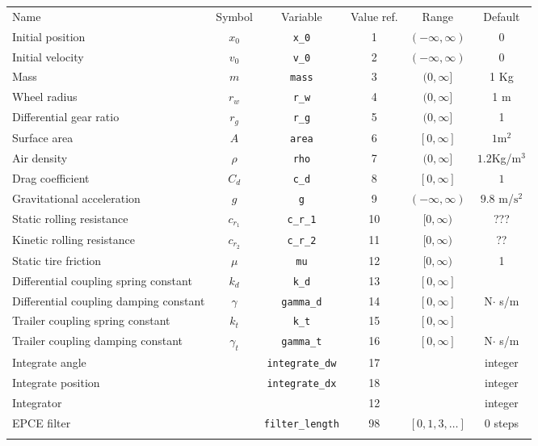 \documentclass[10pt,notitlepage,abstracton]{scrartcl}
\theoremstyle{plain}
\theoremstyle{plain}
\theoremstyle{plain}
\begin{document}
\begin{tabularx}{1.0\linewidth}[H]{ ||X|c|c|c|c|c|| }
  \hhline{|======|}
  Name & Symbol & Variable & Value ref. & Range & Default \\
  \hhline{|======|}
  Initial position & $x_{0}$ & \texttt{x\_0} & 1  & $(-\infty,\infty)$ & 0 \\ \hline
  Initial velocity & $v_{0}$ & \texttt{v\_0} & 2  & $(-\infty,\infty)$ & 0 \\ \hline
  Mass  & $m$ & \texttt{mass}& 3 & $(0,\infty]$ & 1 Kg \\ \hline
  Wheel radius &$r_{w}$& \texttt{r\_w} & 4 &  $(0,\infty]$  &1 m \\ \hline
  Differential gear ratio & $r_{g}$ &\texttt{r\_g} & 5 & $(0,\infty]$ & 1 \\ \hline
  Surface area & $A$& \texttt{area} & 6  & $[0,\infty]$ & $1\text{m}^{2}$ \\ \hline
  Air density & $\rho$ & \texttt{rho} & 7 & $(0,\infty]$ & $1.2$Kg/$\text{m}^{3}$ \\ \hline
  Drag coefficient & $C_{d}$ & \texttt{c\_d} & 8 & $[0,\infty]$ & $1$ \\ \hline
  Gravitational \newline acceleration & $g$ &\texttt{g} & 9 & $(-\infty, \infty)$ & $9.8$ m/$\text{s}^{2}$ \\ \hline
  Static rolling \newline resistance & $c_{r_{1}}$ &\texttt{c\_r\_1} & 10 & $[0, \infty)$ & ???  \\ \hline
  Kinetic rolling \newline resistance & $c_{r_{2}}$ &\texttt{c\_r\_2} & 11 & $[0, \infty)$ & ??  \\ \hline
  Static tire 
  friction & $\mu$ & \texttt{mu} & 12 & $[0, \infty)$ & 1 \\ \hline
  Differential coupling spring constant & $k_{d}$ &\texttt{k\_d} & 13 & $[0,\infty]$ & \\ \hline
  Differential  coupling damping  constant & $\gamma$
                &\texttt{gamma\_d} & 14 & $[0,\infty]$ & N$\cdot$ s/m \\\hline 
  Trailer coupling spring  constant & $k_{t}$ &\texttt{k\_t} & 15 & $[0,\infty]$ & \\ \hline
  Trailer coupling damping  constant & $\gamma_{t}$
                &\texttt{gamma\_t} & 16 & $[0,\infty]$ & N$\cdot$ s/m \\\hline 
  Integrate angle &  & \texttt{\footnotesize{integrate\_dw}} & 17 &  & integer \\\hline
  Integrate position &  & \texttt{\footnotesize{integrate\_dx}} & 18 &  & integer \\\hline
  Integrator &  & & 12 &  & integer \\\hline
  EPCE filter &  & \texttt{\footnotesize{filter\_length}} & 98 &
                                                                 $[0,1,3,\ldots]$ & 0 steps \\
  \hhline{|======|}
\end{tabularx}
\end{document}

